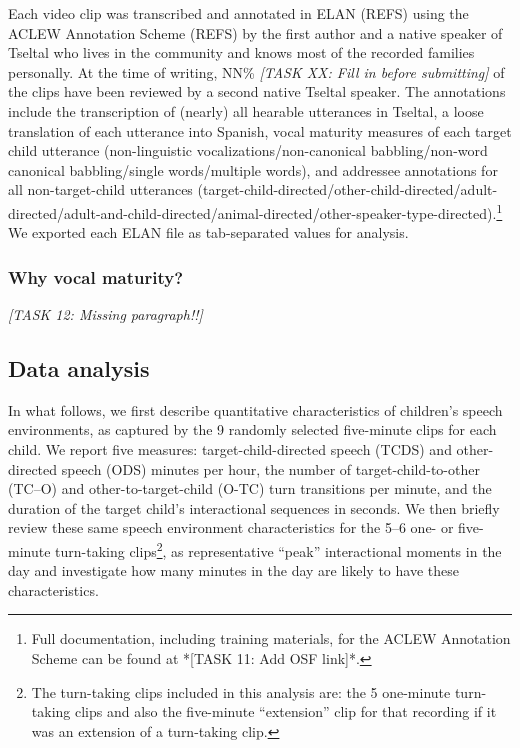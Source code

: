 \documentclass[floatsintext,man]{apa6}
\theoremstyle{definition}
\theoremstyle{definition}
\theoremstyle{definition}
\theoremstyle{remark}
\begin{document}
Each video clip was transcribed and annotated in ELAN (REFS) using the
ACLEW Annotation Scheme (REFS) by the first author and a native speaker
of Tseltal who lives in the community and knows most of the recorded
families personally. At the time of writing, NN\% \emph{{[}TASK XX: Fill
in before submitting{]}} of the clips have been reviewed by a second
native Tseltal speaker. The annotations include the transcription of
(nearly) all hearable utterances in Tseltal, a loose translation of each
utterance into Spanish, vocal maturity measures of each target child
utterance (non-linguistic vocalizations/non-canonical babbling/non-word
canonical babbling/single words/multiple words), and addressee
annotations for all non-target-child utterances
(target-child-directed/other-child-directed/adult-directed/adult-and-child-directed/animal-directed/other-speaker-type-directed).\footnote{Full documentation, including training materials, for the ACLEW Annotation Scheme can be found at *[TASK 11: Add OSF link]*.}
We exported each ELAN file as tab-separated values for analysis.

\subsubsection{Why vocal maturity?}\label{why-vocal-maturity}

\emph{{[}TASK 12: Missing paragraph!!{]}}

\subsection{Data analysis}\label{methods-analysisinfo}

In what follows, we first describe quantitative characteristics of
children's speech environments, as captured by the 9 randomly selected
five-minute clips for each child. We report five measures:
target-child-directed speech (TCDS) and other-directed speech (ODS)
minutes per hour, the number of target-child-to-other (TC--O) and
other-to-target-child (O-TC) turn transitions per minute, and the
duration of the target child's interactional sequences in seconds. We
then briefly review these same speech environment characteristics for
the 5--6 one- or five-minute turn-taking clips\footnote{The turn-taking
  clips included in this analysis are: the 5 one-minute turn-taking
  clips and also the five-minute \enquote{extension} clip for that
  recording if it was an extension of a turn-taking clip.}, as
representative \enquote{peak} interactional moments in the day and
investigate how many minutes in the day are likely to have these
characteristics.
\end{document}
